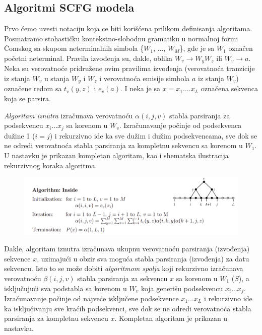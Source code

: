 \documentclass[a4paper, 12pt]{article}
\begin{document}
\subsection{Algoritmi SCFG modela}

Prvo ćemo uvesti notaciju koja ce biti korišćena prilikom definisanja algoritama. Posmatramo stohastičku kontekstno-slobodnu gramatiku u normalnoj formi Čomskog sa skupom neterminalnih simbola \{$W_1$, ..., $W_M$\}, gde je sa $W_1$ označen početni neterminal. Pravila izvođenja su, dakle, oblika $W_v \rightarrow W_yW_z$ ili $W_v \rightarrow a$. Neka su verovatnoće pridružene ovim pravilima izvođenja (verovatnoća tranzicije iz stanja $W_v$ u stanja $W_y$ i $W_z$ i verovatnoća emisije simbola $a$ iz stanja $W_v$) označene redom sa $t_v(y, z)$ i $e_v(a)$. I neka je sa $x = x_1....x_L$ označena sekvenca koja se parsira.

\textit{Algoritam iznutra} izračunava verovatnoću $\alpha(i, j, v)$ stabla parsiranja za podsekvencu $x_i...x_j$ sa korenom u $W_v$. Izračunavanje počinje od podsekvenca dužine 1 ($i = j$) i rekurzivno ide ka sve dužim i dužim podsekvencama, sve dok se ne odredi verovatnoća stabla parsiranja za kompletnu sekvencu sa korenom u $W_1$. U nastavku je prikazan kompletan algoritam, kao i shematska ilustracija rekurzivnog koraka algoritma.

\begin{figure}[h!]
  \centering
  \vspace{-0.4cm}
  \includegraphics[width=\textwidth]{inside}
\end{figure}

Dakle, algoritam iznutra izračunava ukupnu verovatnoću parsiranja (izvođenja) sekvence $x$, uzimajući u obzir sva moguća stabla parsiranja (izvođenja) za datu sekvencu. Isto to se može dobiti \textit{algoritmom spolja} koji rekurzivno izračunava verovatnoću $\beta(i, j, v)$ stabla parsiranja za sekvencu $x$ sa korenom u $W_1$ ($S$), a isključujući sva podstabla sa korenom u $W_v$ koja generišu podsekvencu $x_i...x_j$. Izračunavanje počinje od najveće isključene podsekvence $x_1...x_L$ i rekurzivno ide ka isključivanju sve kraćih podsekvenci, sve dok se ne odredi verovatnoća stabla parsiranja za kompletnu sekvencu $x$. Kompletan algoritam je prikazan u nastavku.
\end{document}
